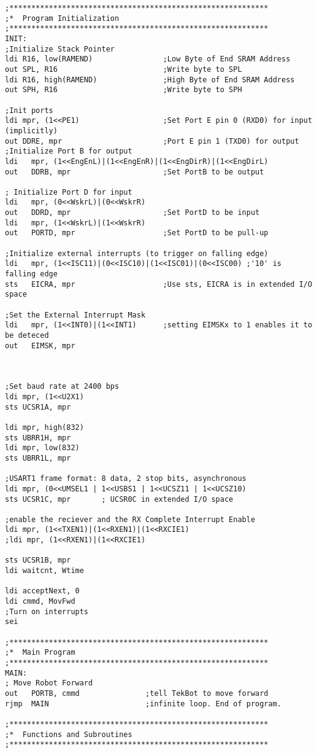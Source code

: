 \documentclass[12pt,letterpaper]{article}
\begin{document}
\begin{verbatim}
;***********************************************************
;*	Program Initialization
;***********************************************************
INIT:
;Initialize Stack Pointer
ldi R16, low(RAMEND) 				;Low Byte of End SRAM Address
out SPL, R16 						;Write byte to SPL
ldi R16, high(RAMEND) 				;High Byte of End SRAM Address
out SPH, R16 						;Write byte to SPH	

;Init ports
ldi mpr, (1<<PE1)	 				;Set Port E pin 0 (RXD0) for input (implicitly)
out DDRE, mpr						;Port E pin 1 (TXD0) for output
;Initialize Port B for output
ldi   mpr, (1<<EngEnL)|(1<<EngEnR)|(1<<EngDirR)|(1<<EngDirL)
out   DDRB, mpr         			;Set PortB to be output

; Initialize Port D for input
ldi   mpr, (0<<WskrL)|(0<<WskrR)
out   DDRD, mpr         			;Set PortD to be input
ldi   mpr, (1<<WskrL)|(1<<WskrR)
out   PORTD, mpr        			;Set PortD to be pull-up 

;Initialize external interrupts (to trigger on falling edge)
ldi   mpr, (1<<ISC11)|(0<<ISC10)|(1<<ISC01)|(0<<ISC00) ;'10' is falling edge
sts   EICRA, mpr        			;Use sts, EICRA is in extended I/O space

;Set the External Interrupt Mask
ldi   mpr, (1<<INT0)|(1<<INT1) 		;setting EIMSKx to 1 enables it to be deteced
out   EIMSK, mpr



;Set baud rate at 2400 bps
ldi mpr, (1<<U2X1)
sts UCSR1A, mpr

ldi mpr, high(832)
sts UBRR1H, mpr
ldi mpr, low(832)
sts UBRR1L, mpr

;USART1 frame format: 8 data, 2 stop bits, asynchronous
ldi mpr, (0<<UMSEL1 | 1<<USBS1 | 1<<UCSZ11 | 1<<UCSZ10)
sts UCSR1C, mpr       ; UCSR0C in extended I/O space

;enable the reciever and the RX Complete Interrupt Enable
ldi mpr, (1<<TXEN1)|(1<<RXEN1)|(1<<RXCIE1) 
;ldi mpr, (1<<RXEN1)|(1<<RXCIE1) 

sts UCSR1B, mpr
ldi waitcnt, Wtime

ldi acceptNext, 0
ldi cmmd, MovFwd
;Turn on interrupts
sei

;***********************************************************
;*	Main Program
;***********************************************************
MAIN:
; Move Robot Forward
out   PORTB, cmmd				;tell TekBot to move forward
rjmp  MAIN						;infinite loop. End of program.

;***********************************************************
;*	Functions and Subroutines
;***********************************************************


\end{verbatim}
\end{document}

